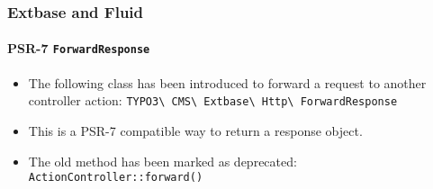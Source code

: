 %

\begin{frame}[fragile]
	\frametitle{Extbase and Fluid}
	\framesubtitle{PSR-7 \texttt{ForwardResponse}}

	\begin{itemize}
		\item The following class has been introduced to forward a request to
			another controller action:
			\smaller\texttt{TYPO3\textbackslash
				CMS\textbackslash
				Extbase\textbackslash
				Http\textbackslash
				ForwardResponse}\normalsize
		\item This is a PSR-7 compatible way to return a response object.
		\item The old method has been marked as deprecated:\newline
			\smaller\texttt{ActionController::forward()}\normalsize

	\end{itemize}

\end{frame}

